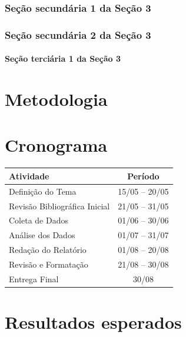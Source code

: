 \documentclass[a4paper,12pt,oneside,extrafontsizes]{memoir}
\begin{document}
\subsection{Seção secundária 1 da Seção 3}

\subsection{Seção secundária 2 da Seção 3}

\subsubsection{Seção terciária 1 da Seção 3}

\chapter{Metodologia}

\chapter{Cronograma}
\begin{tabularx}{\textwidth}{|X|c|}
\hline
\textbf{Atividade} & \textbf{Período}  \\
\hline
Definição do Tema & 15/05 – 20/05  \\
\hline
Revisão Bibliográfica Inicial & 21/05 – 31/05  \\
\hline
Coleta de Dados & 01/06 – 30/06  \\
\hline
Análise dos Dados & 01/07 – 31/07  \\
\hline
Redação do Relatório & 01/08 – 20/08  \\
\hline
Revisão e Formatação & 21/08 – 30/08  \\
\hline
Entrega Final & 30/08  \\
\hline
\end{tabularx}

\chapter{Resultados esperados}

\backmatter{
\renewcommand{\bibname}{Referências}
\bibintoc


}
\end{document}
